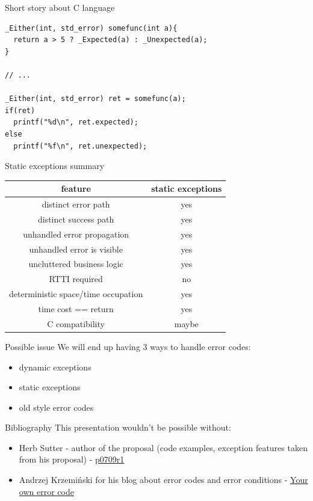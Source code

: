 \documentclass[10pt]{beamer}
\begin{document}
\begin{frame}[fragile]{Short story about C language}
	\begin{verbatim}
_Either(int, std_error) somefunc(int a){
  return a > 5 ? _Expected(a) : _Unexpected(a);
}

// ...

_Either(int, std_error) ret = somefunc(a);
if(ret)
  printf("%d\n", ret.expected);
else
  printf("%f\n", ret.unexpected);
	\end{verbatim}
\end{frame}

\begin{frame}{Static exceptions summary}
\centering
	\begin{tabular}{|c|c|}
		\hline
		feature & static exceptions \\ \hline \hline
		distinct error path & yes \\ \hline
		distinct success path & yes \\ \hline \hline
		unhandled error propagation & yes \\ \hline
		unhandled error is visible & yes \\ \hline
		uncluttered business logic & yes \\ \hline \hline
		RTTI required & no \\ \hline
		deterministic space/time occupation & yes \\ \hline
		time cost == return & yes \\ \hline \hline
		C compatibility & maybe \\ \hline
	\end{tabular}
\end{frame}

\begin{frame}{Possible issue}
	We will end up having 3 ways to handle error codes:
	\begin{itemize}
		\item dynamic exceptions
		\item static exceptions
		\item old style error codes
	\end{itemize}

	\vfill
\end{frame}

\begin{frame}{Bibliography}
	This presentation wouldn't be possible without:
	
	\begin{itemize}
		\item Herb Sutter - author of the proposal (code examples, exception features taken from his proposal) -  \href{http://www.open-std.org/jtc1/sc22/wg21/docs/papers/2018/p0709r1.pdf}{p0709r1}
		
		\item Andrzej Krzemiński for his blog about error codes and error conditions -  \href{https://akrzemi1.wordpress.com/2017/07/12/your-own-error-code/}{Your own error code}
	\end{itemize}
\end{frame}
\end{document}
